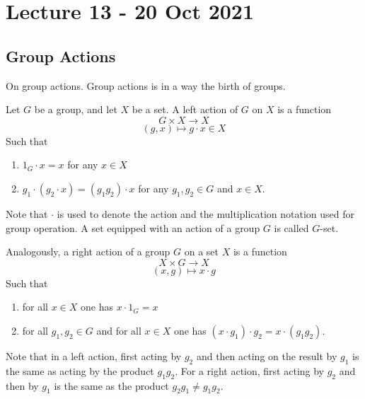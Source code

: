\section{Lecture 13 - 20 Oct 2021}
\subsection{Group Actions}
On group actions. Group actions is in a way the birth of groups.
\begin{definition} 
  Let $G$ be a group, and let $X$ be a set. A left action of $G$ on $X$ is a function
  \[G\times X \to X\]
  \[(g,x)\mapsto g\cdot x\in X\]
  Such that 
  \begin{enumerate}
    \item $1_G \cdot x=x$ for any $x\in X$
    \item $g_1 \cdot (g_2\cdot x) = (g_1g_2)\cdot x$ for any $g_1,g_2\in G$ and $x\in X$.
  \end{enumerate}
  Note that $\cdot$ is used to denote the action and the multiplication notation used for
  group operation. A set equipped with an action of a group $G$ is called $G$-set.
  \label{def:leftAction}
\end{definition}

\begin{definition}
  Analogously, a right action of a group $G$ on a set $X$ is a function
  \[X\times G \to X\]
  \[(x,g)\mapsto x\cdot g\]
  Such that
  \begin{enumerate}
    \item for all $x\in X$ one has $x\cdot 1_G=x$
    \item for all $g_1,g_2\in G$ and for all $x\in X$ one has $(x\cdot g_1)\cdot g_2 =
      x\cdot (g_1g_2)$.
  \end{enumerate}
  \label{def:rightAction}
\end{definition}

\begin{remark}
  Note that in a left action, first acting by $g_2$ and then acting on the result by $g_1$
  is the same as acting by the product $g_1g_2$. For a right action, first acting by $g_2$
  and then by $g_1$ is the same as the product $g_2g_1\neq g_1g_2$.
\end{remark}


